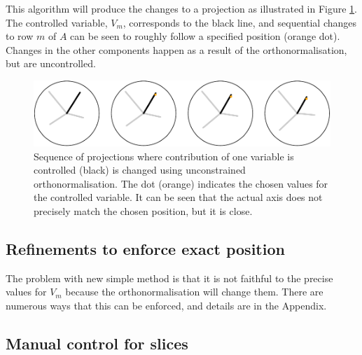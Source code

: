 \documentclass[]{interact}
\theoremstyle{plain}%
\theoremstyle{definition}
\theoremstyle{remark}
\begin{document}
This algorithm will produce the changes to a projection as illustrated
in Figure \ref{fig:manualsequence}. The controlled variable, \(V_m\),
corresponds to the black line, and sequential changes to row \(m\) of
\(A\) can be seen to roughly follow a specified position (orange dot).
Changes in the other components happen as a result of the
orthonormalisation, but are uncontrolled.

\begin{figure}
\includegraphics[width=1\linewidth]{paper_files/figure-latex/manualsequence-1} \caption{Sequence of projections where contribution of one variable is controlled (black) is changed using unconstrained orthonormalisation. The dot (orange) indicates the chosen values for the controlled variable. It can be seen that the actual axis does not precisely match the chosen position, but it is close.}\label{fig:manualsequence}
\end{figure}

\hypertarget{refinements-to-enforce-exact-position}{%
\subsection{Refinements to enforce exact
position}\label{refinements-to-enforce-exact-position}}

The problem with new simple method is that it is not faithful to the
precise values for \(V_m\) because the orthonormalisation will change
them. There are numerous ways that this can be enforced, and details are
in the Appendix.

\hypertarget{manual-control-for-slices}{%
\subsection{Manual control for slices}\label{manual-control-for-slices}}
\end{document}
